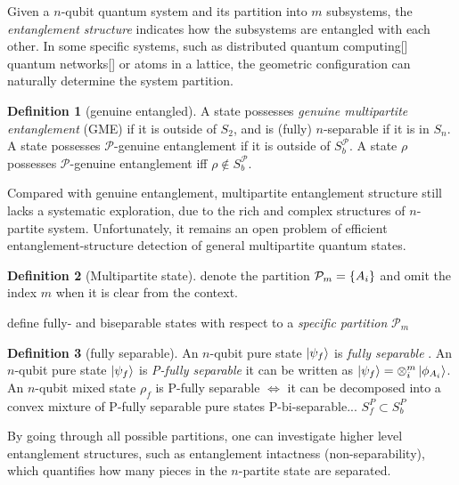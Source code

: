 \documentclass[
10pt,
aps,
pra,
linenumbers,
floatfix,
]{revtex4-2}
\theoremstyle{plain}
\theoremstyle{definition}
\newtheorem{definition}{Definition}
\newtheorem{remark}{Remark}
\newcommand{\ppartition}{\mathcal{P}}
\newcommand{\dm}{\rho}
\begin{document}
Given a $n$-qubit quantum system and its partition into $m$ subsystems, the \emph{entanglement structure} indicates how the subsystems are entangled with each other.
In some specific systems, such as distributed quantum computing[] quantum networks[] or atoms in a lattice, the geometric configuration can naturally determine the system partition.

\begin{definition}[genuine entangled]\label{def:genuinely_entangled}
	A state possesses \emph{genuine multipartite entanglement} (GME) if it is outside of $S_2$, and is (fully) $n$-separable if it is in $S_n$.
	A state possesses $\ppartition$-genuine entanglement if it is outside of $S_b^\ppartition$.
	A state $\dm$ possesses $\ppartition$-genuine entanglement iff $\dm\notin S_b^\ppartition$.
\end{definition}
	Compared with genuine entanglement, multipartite entanglement structure still lacks a systematic exploration, due to the rich and complex structures of $n$-partite system.
	Unfortunately, it remains an open problem of efficient entanglement-structure detection of general multipartite quantum states.
\begin{definition}[Multipartite state]
	denote the partition $\ppartition_m = \qty{A_i}$
	and omit the index $m$ when it is clear from the context.
\end{definition}
define fully- and biseparable states with respect to a \emph{specific partition} $\ppartition_m$
\begin{definition}[fully separable]\label{def:fully_separable}
	An $n$-qubit pure state $\ket{\psi_f}$ is \emph{fully separable} \iff .
	An $n$-qubit pure state $\ket{\psi_f}$ is \emph{P-fully separable} \iff it can be written as 
	$\ket{\psi_f}=\otimes_i^m \ket{\phi_{A_i}}$.
	An $n$-qubit mixed state $\dm_f$ is P-fully separable $\iff$ it can be decomposed into a convex mixture of P-fully separable pure states 
	P-bi-separable... $S_f^P \subset S_b^P$
\end{definition}
By going through all possible partitions, one can investigate higher level entanglement structures, such as entanglement intactness (non-separability), which quantifies how many pieces in the $n$-partite state are separated.
\end{document}
